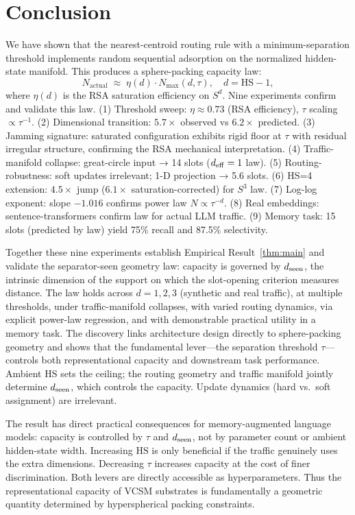 \documentclass[11pt]{article}
\begin{document}
\section{Conclusion}

We have shown that the nearest-centroid routing rule with a minimum-separation
threshold implements random sequential adsorption on the normalized hidden-state
manifold.
This produces a sphere-packing capacity law:
\[
  N_{\mathrm{actual}} \;\approx\; \eta(d) \cdot N_{\max}(d, \tau),
  \quad d = \mathrm{HS} - 1,
\]
where $\eta(d)$ is the RSA saturation efficiency on $S^d$.
Nine experiments confirm and validate this law.
(1) Threshold sweep: $\eta \approx 0.73$ (RSA efficiency), $\tau$ scaling $\propto \tau^{-1}$.
(2) Dimensional transition: $5.7\times$ observed vs $6.2\times$ predicted.
(3) Jamming signature: saturated configuration exhibits rigid floor at $\tau$ with residual irregular structure,
confirming the RSA mechanical interpretation.
(4) Traffic-manifold collapse: great-circle input → 14 slots ($d_{\rm eff}=1$ law).
(5) Routing-robustness: soft updates irrelevant; 1-D projection → 5.6 slots.
(6) HS=4 extension: $4.5\times$ jump ($6.1\times$ saturation-corrected) for $S^3$ law.
(7) Log-log exponent: slope $-1.016$ confirms power law $N \propto \tau^{-d}$.
(8) Real embeddings: sentence-transformers confirm law for actual LLM traffic.
(9) Memory task: 15 slots (predicted by law) yield 75\% recall and 87.5\% selectivity.

Together these nine experiments establish Empirical Result~\ref{thm:main} and validate
the separator-seen geometry law: capacity is governed by $d_{\rm seen}$,
the intrinsic dimension of the support on which the slot-opening
criterion measures distance.
The law holds across $d = 1, 2, 3$ (synthetic and real traffic),
at multiple thresholds, under traffic-manifold collapses, with varied routing dynamics,
via explicit power-law regression, and with demonstrable practical utility in a memory task.
The discovery links architecture design directly to sphere-packing geometry and
shows that the fundamental lever—the separation threshold $\tau$—controls
both representational capacity and downstream task performance.
Ambient $\mathrm{HS}$ sets the ceiling; the routing geometry and traffic manifold
jointly determine $d_{\rm seen}$, which controls the capacity.
Update dynamics (hard vs.\ soft assignment) are irrelevant.

The result has direct practical consequences for memory-augmented language
models: capacity is controlled by $\tau$ and $d_{\rm seen}$, not by parameter
count or ambient hidden-state width.
Increasing $\mathrm{HS}$ is only beneficial if the traffic genuinely uses the
extra dimensions.
Decreasing $\tau$ increases capacity at the cost of finer discrimination.
Both levers are directly accessible as hyperparameters.
Thus the representational capacity of VCSM substrates is fundamentally a geometric quantity determined by hyperspherical packing constraints.
\end{document}
